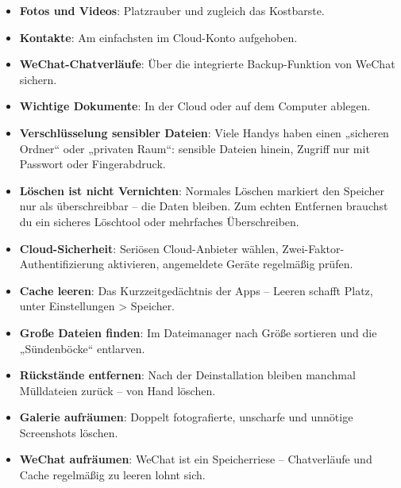 
\begin{itemize}
  \item \textbf{Fotos und Videos}: Platzrauber und zugleich das Kostbarste.
  \item \textbf{Kontakte}: Am einfachsten im Cloud-Konto aufgehoben.
  \item \textbf{WeChat-Chatverläufe}: Über die integrierte Backup-Funktion von WeChat sichern.
  \item \textbf{Wichtige Dokumente}: In der Cloud oder auf dem Computer ablegen.
\end{itemize}


\begin{itemize}
  \item \textbf{Verschlüsselung sensibler Dateien}: Viele Handys haben einen „sicheren Ordner“ oder „privaten Raum“: sensible Dateien hinein, Zugriff nur mit Passwort oder Fingerabdruck.
  \item \textbf{Löschen ist nicht Vernichten}: Normales Löschen markiert den Speicher nur als überschreibbar – die Daten bleiben. Zum echten Entfernen brauchst du ein sicheres Löschtool oder mehrfaches Überschreiben.
  \item \textbf{Cloud-Sicherheit}: Seriösen Cloud-Anbieter wählen, Zwei-Faktor-Authentifizierung aktivieren, angemeldete Geräte regelmäßig prüfen.
\end{itemize}


\begin{itemize}
  \item \textbf{Cache leeren}: Das Kurzzeitgedächtnis der Apps – Leeren schafft Platz, unter Einstellungen > Speicher.
  \item \textbf{Große Dateien finden}: Im Dateimanager nach Größe sortieren und die „Sündenböcke“ entlarven.
  \item \textbf{Rückstände entfernen}: Nach der Deinstallation bleiben manchmal Mülldateien zurück – von Hand löschen.
  \item \textbf{Galerie aufräumen}: Doppelt fotografierte, unscharfe und unnötige Screenshots löschen.
  \item \textbf{WeChat aufräumen}: WeChat ist ein Speicherriese – Chatverläufe und Cache regelmäßig zu leeren lohnt sich.
\end{itemize}

